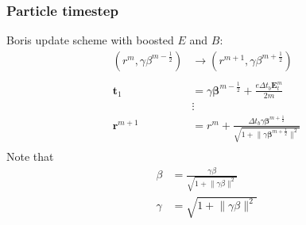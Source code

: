 \documentclass[5pt]{beamer}
\begin{document}
\begin{frame}
  \frametitle{Particle timestep}
Boris update scheme with boosted $E$ and $B$: \cite{fallahi2020mithra}\\
\begin{align*}
  \left(r^m, \gamma \beta ^ {m - \frac{1}{2}}\right) &\rightarrow \left(r^{m + 1}, \gamma \beta ^ {m + \frac{1}{2}}\right) \\ \\
  \mathbf{t}_1 &= \gamma \mathbf{\beta}^{m - \frac 1 2} + \frac{e \Delta t_b \mathbf{E}_t^m}{2 m} \\
  &\vdots \\
  \mathbf{r}^{m + 1} &= r^m + \frac{\Delta t_b \gamma \bm{\beta}^{m + \frac 1 2}}{\sqrt{1 + \lVert\gamma \mathbf{\beta}^{m + \frac 1 2}\rVert^2}} \\
\end{align*}
\pause
Note that \\
\begin{align*}
\beta &= \frac{\gamma \beta}{\sqrt{1 + \lVert \gamma \beta \rVert^2}} \\
\gamma &= \sqrt{1 + \lVert \gamma \beta \rVert^2}
\end{align*}
\end{frame}
\end{document}

